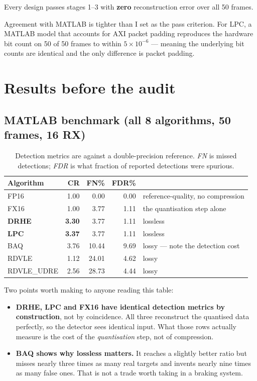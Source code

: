 \documentclass[11pt,a4paper]{article}
\begin{document}
\noindent
Every design passes stages 1--3 with \textbf{zero} reconstruction error over
all 50 frames.

Agreement with MATLAB is tighter than I set as the pass criterion. For LPC, a
MATLAB model that accounts for AXI packet padding reproduces the hardware bit
count on \num{50} of \num{50} frames to within $5\times10^{-6}$ --- meaning the
underlying bit counts are identical and the only difference is packet padding.

\section{Results before the audit}

\subsection{MATLAB benchmark (all 8 algorithms, 50 frames, 16 RX)}

\begin{table}[h]
\centering
\small
\caption{Detection metrics are against a double-precision reference.
\emph{FN} is missed detections; \emph{FDR} is what fraction of reported
detections were spurious.}
\begin{tabular}{@{}lrrrl@{}}
\toprule
Algorithm & CR & FN\% & FDR\% & \\
\midrule
FP16          & 1.00 & 0.00  & 0.00 & reference-quality, no compression\\
FX16          & 1.00 & 3.77  & 1.11 & the quantisation step alone\\
\textbf{DRHE} & \textbf{3.30} & 3.77 & 1.11 & lossless\\
\textbf{LPC}  & \textbf{3.37} & 3.77 & 1.11 & lossless\\
BAQ           & 3.76 & 10.44 & 9.69 & lossy --- note the detection cost\\
RDVLE         & 1.12 & 24.01 & 4.62 & lossy\\
RDVLE\_UDRE   & 2.56 & 28.73 & 4.44 & lossy\\
\bottomrule
\end{tabular}
\end{table}

Two points worth making to anyone reading this table:

\begin{itemize}
\item \textbf{DRHE, LPC and FX16 have identical detection metrics by
construction}, not by coincidence. All three reconstruct the quantised data
perfectly, so the detector sees identical input. What those rows actually
measure is the cost of the \emph{quantisation} step, not of compression.

\item \textbf{BAQ shows why lossless matters.} It reaches a slightly better
ratio but misses nearly three times as many real targets and invents nearly
nine times as many false ones. That is not a trade worth taking in a braking
system.
\end{itemize}
\end{document}
